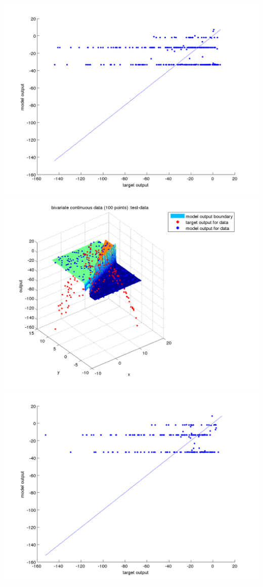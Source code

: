 \documentclass[fleqn]{article}
\begin{document}
\includegraphics[scale=0.4]{./pics/bivariate100/_2_4/_2_4_epoch_1_validation-data_scatter2d}
\includegraphics[scale=0.4]{./pics/bivariate100/_2_4/_2_4_epoch_1_test-data_scatter3d}
\includegraphics[scale=0.4]{./pics/bivariate100/_2_4/_2_4_epoch_1_test-data_scatter2d}
\end{document}
